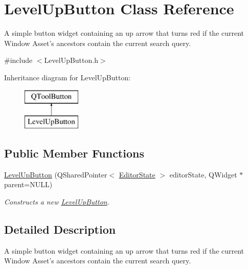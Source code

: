 \hypertarget{class_level_up_button}{\section{Level\-Up\-Button Class Reference}
\label{class_level_up_button}
}


A simple button widget containing an up arrow that turns red if the current Window Asset's ancestors contain the current search query.  




{\ttfamily \#include $<$Level\-Up\-Button.\-h$>$}

Inheritance diagram for Level\-Up\-Button\-:\begin{figure}[H]
\begin{center}
\leavevmode
\includegraphics[height=2.000000cm]{class_level_up_button}
\end{center}
\end{figure}
\subsection*{Public Member Functions}
\begin{DoxyCompactItemize}
\item 
\hyperlink{class_level_up_button_aa07bb8c59553adb960a46105551c5fab}{Level\-Up\-Button} (Q\-Shared\-Pointer$<$ \hyperlink{class_editor_state}{Editor\-State} $>$ editor\-State, Q\-Widget $\ast$parent=N\-U\-L\-L)
\begin{DoxyCompactList}\small\item\em Constructs a new \hyperlink{class_level_up_button}{Level\-Up\-Button}. \end{DoxyCompactList}\end{DoxyCompactItemize}


\subsection{Detailed Description}
A simple button widget containing an up arrow that turns red if the current Window Asset's ancestors contain the current search query. 

